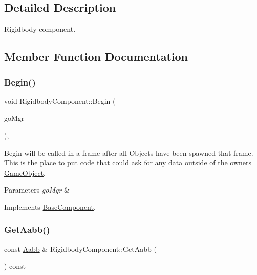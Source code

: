 \subsection{Detailed Description}
Rigidbody component. 

\subsection{Member Function Documentation}
\mbox{\label{classRigidbodyComponent_af18ec4b42ca0c975e79f228fb515f2ac}} 
\subsubsection{\texorpdfstring{Begin()}{Begin()}}
{\footnotesize\ttfamily void Rigidbody\+Component\+::\+Begin (\begin{DoxyParamCaption}\item[{\hyperlink{classGameObjectManager}{Game\+Object\+Manager} $\ast$}]{go\+Mgr }\end{DoxyParamCaption})\hspace{0.3cm}{\ttfamily [override]}, {\ttfamily [virtual]}}



Begin will be called in a frame after all Objects have been spawned that frame. This is the place to put code that could ask for any data outside of the owner\textquotesingle{}s \hyperlink{classGameObject}{Game\+Object}. 


\begin{DoxyParams}{Parameters}
{\em go\+Mgr} & \\
\hline
\end{DoxyParams}


Implements \hyperlink{classBaseComponent}{Base\+Component}.

\mbox{\label{classRigidbodyComponent_a383ec958d3a98df5b7870fb582834b14}} 
\subsubsection{\texorpdfstring{Get\+Aabb()}{GetAabb()}}
{\footnotesize\ttfamily const \hyperlink{classAabb}{Aabb} \& Rigidbody\+Component\+::\+Get\+Aabb (\begin{DoxyParamCaption}{ }\end{DoxyParamCaption}) const}



